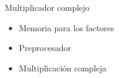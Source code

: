 \begin{frame}{Multiplicador complejo}
\begin{itemize}
  \item<1-> Memoria para los factores
  \item<2-> Preprocesador
  \item<3-> Multiplicación compleja
\end{itemize}
\end{frame}

